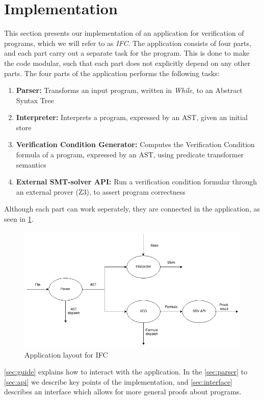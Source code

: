 \section{Implementation}\label{sec:implementation}
This section presents our implementation of an application for verification of programs, which we will refer to as \textit{IFC}.
The application consists of four parts, and each part carry out a separate task for the program. 
This is done to make the code modular, such that each part does not explicitly depend on any other parts. 
The four parts of the application performs the following tasks:
\begin{enumerate}
  \item \textbf{Parser:} Transforms an input program, written in \textit{While}, to an Abstract Syntax Tree
  \item \textbf{Interpreter:} Interprets a program, expressed by an AST, given an initial store
  \item \textbf{Verification Condition Generator:} Computes the Verification Condition formula of a program, expressed by an AST, using predicate transformer semantics
  \item \textbf{External SMT-solver API:} Run a verification condition formular through an external prover (Z3), to assert program correctness
\end{enumerate}
Although each part can work seperately, they are connected in the application, as seen in \cref{fig:flow}.

\begin{figure}[h]
  \includegraphics[width=\linewidth]{Implementation/IFCapp.png}
  \caption{Application layout for IFC}
  \label{fig:flow}
\end{figure}

\cref{sec:guide} explains how to interact with the application. In the \cref{sec:parser} to \cref{sec:api} we describe key points of the implementation, and \cref{sec:interface} describes an interface which allows for more general proofs about programs.










